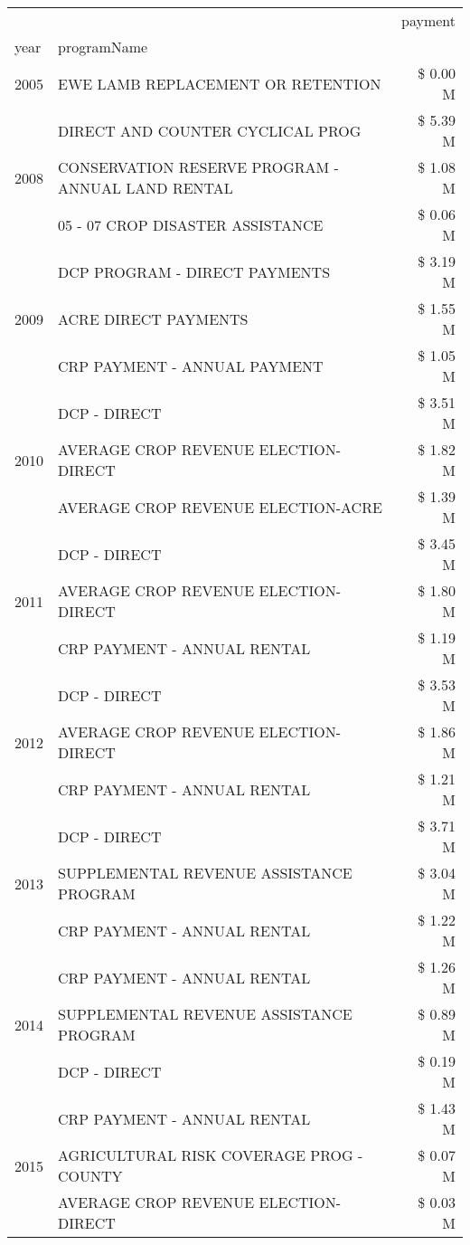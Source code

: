 \begin{tabular}{llr}
\toprule
 &  & payment \\
year & programName &  \\
\midrule
2005 & EWE LAMB REPLACEMENT OR RETENTION & \$ 0.00 M \\
\cline{1-3}
\multirow[t]{3}{*}{2008} & DIRECT AND COUNTER CYCLICAL PROG & \$ 5.39 M \\
 & CONSERVATION RESERVE PROGRAM - ANNUAL LAND RENTAL & \$ 1.08 M \\
 & 05 - 07 CROP DISASTER ASSISTANCE & \$ 0.06 M \\
\cline{1-3}
\multirow[t]{3}{*}{2009} & DCP PROGRAM - DIRECT PAYMENTS & \$ 3.19 M \\
 & ACRE DIRECT PAYMENTS & \$ 1.55 M \\
 & CRP PAYMENT - ANNUAL PAYMENT & \$ 1.05 M \\
\cline{1-3}
\multirow[t]{3}{*}{2010} & DCP - DIRECT & \$ 3.51 M \\
 & AVERAGE CROP REVENUE ELECTION-DIRECT & \$ 1.82 M \\
 & AVERAGE CROP REVENUE ELECTION-ACRE & \$ 1.39 M \\
\cline{1-3}
\multirow[t]{3}{*}{2011} & DCP - DIRECT & \$ 3.45 M \\
 & AVERAGE CROP REVENUE ELECTION-DIRECT & \$ 1.80 M \\
 & CRP PAYMENT - ANNUAL RENTAL & \$ 1.19 M \\
\cline{1-3}
\multirow[t]{3}{*}{2012} & DCP - DIRECT & \$ 3.53 M \\
 & AVERAGE CROP REVENUE ELECTION-DIRECT & \$ 1.86 M \\
 & CRP PAYMENT - ANNUAL RENTAL & \$ 1.21 M \\
\cline{1-3}
\multirow[t]{3}{*}{2013} & DCP - DIRECT & \$ 3.71 M \\
 & SUPPLEMENTAL REVENUE ASSISTANCE PROGRAM & \$ 3.04 M \\
 & CRP PAYMENT - ANNUAL RENTAL & \$ 1.22 M \\
\cline{1-3}
\multirow[t]{3}{*}{2014} & CRP PAYMENT - ANNUAL RENTAL & \$ 1.26 M \\
 & SUPPLEMENTAL REVENUE ASSISTANCE PROGRAM & \$ 0.89 M \\
 & DCP - DIRECT & \$ 0.19 M \\
\cline{1-3}
\multirow[t]{3}{*}{2015} & CRP PAYMENT - ANNUAL RENTAL & \$ 1.43 M \\
 & AGRICULTURAL RISK COVERAGE PROG - COUNTY & \$ 0.07 M \\
 & AVERAGE CROP REVENUE ELECTION-DIRECT & \$ 0.03 M \\

\end{tabular}
